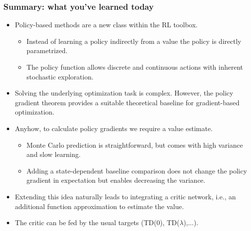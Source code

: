 \begin{frame}
\frametitle{Summary: what you've learned today}
\begin{itemize}
	\item Policy-based methods are a new class within the RL toolbox.
	\begin{itemize}
		\item Instead of learning a policy indirectly from a value the policy is directly parametrized.\pause
		\item The policy function allows discrete and continuous actions with inherent stochastic exploration.\pause
	\end{itemize}
	\item Solving the underlying optimization task is complex. However, the policy gradient theorem provides a suitable theoretical baseline for gradient-based optimization.\pause
	\item Anyhow, to calculate policy gradients we require a value estimate.
	\begin{itemize}
		\item Monte Carlo prediction is straightforward, but comes with high variance and slow learning.\pause
		\item Adding a state-dependent baseline comparison does not change the policy gradient in expectation but enables decreasing the variance.\pause
	\end{itemize}
	\item Extending this idea naturally leads to integrating a critic network, i.e., an additional function approximation to estimate the value.\pause
	\item The critic can be fed by the usual targets (TD(0), TD($\lambda$),...).
\end{itemize}
\end{frame}